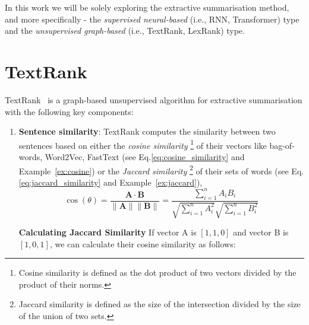 In this work we will be solely exploring the extractive summarisation method, and more specifically - the \emph{supervised neural-based} (i.e., RNN, Transformer) type and the \emph{unsupervised graph-based} (i.e., TextRank, LexRank) type.

\section{TextRank}\label{sec:textrank}
TextRank~\cite{mihalcea-tarau-2004-textrank} is a graph-based unsupervised algorithm for extractive summarisation with the following key components:
\begin{enumerate}
    \item \textbf{Sentence similarity}: TextRank computes the similarity between two sentences based on either the \emph{cosine similarity}
        \footnote{
            Cosine similarity is defined as the dot product of two vectors divided by the product of their norms.
        } of their vectors like bag-of-words, Word2Vec, FastText (see Eq.\ref{eq:cosine_similarity} and Example~\ref{ex:cosine}) or the \emph{Jaccard similarity}
        \footnote{
            Jaccard similarity is defined as the size of the intersection divided by the size of the union of two sets.
        } of their sets of words (see Eq.\ref{eq:jaccard_similarity} and Example~\ref{ex:jaccard}),
        \begin{equation}\label{eq:cosine_similarity}
            \cos(\theta) = \frac{\mathbf{A} \cdot \mathbf{B}}{\|\mathbf{A}\| \|\mathbf{B}\|} = \frac{\sum_{i=1}^{n} A_i B_i}{\sqrt{\sum_{i=1}^{n} A_i^2} \sqrt{\sum_{i=1}^{n} B_i^2}}
        \end{equation}
        \begin{beaux_exemples}{\textbf{Calculating Jaccard Similarity}}\label{ex:cosine}
            If vector A is $[1, 1, 0]$ and vector B is $[1, 0, 1]$, we can calculate their cosine similarity as follows:


\end{beaux_exemples}
\end{enumerate}
